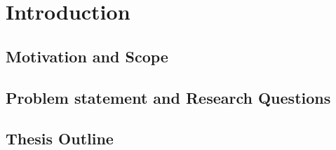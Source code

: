 

\chapter{Introduction}  %

\placeholder{}

\ifpdf
    \graphicspath{{Chapter1/Figs/Raster/}{Chapter1/Figs/PDF/}{Chapter1/Figs/}}
\else
    \graphicspath{{Chapter1/Figs/Vector/}{Chapter1/Figs/}}
\fi


\section{Motivation and Scope} %



\section{Problem statement and Research Questions}  %



\section{Thesis Outline} 

